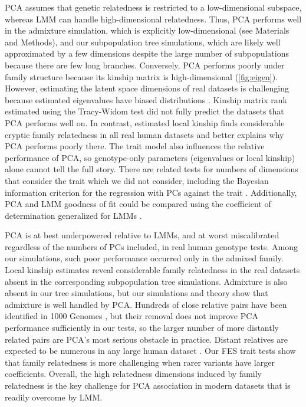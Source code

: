 \documentclass[11pt]{article}
\begin{document}
\begin{linenumbers}
PCA assumes that genetic relatedness is restricted to a low-dimensional subspace, whereas LMM can handle high-dimensional relatedness.
Thus, PCA performs well in the admixture simulation, which is explicitly low-dimensional (see Materials and Methods), and our subpopulation tree simulations, which are likely well approximated by a few dimensions despite the large number of subpopulations because there are few long branches.
Conversely, PCA performs poorly under family structure because its kinship matrix is high-dimensional (\cref{fig:eigen}).
However, estimating the latent space dimensions of real datasets is challenging because estimated eigenvalues have biased distributions \citep{hayashi_bias_2018}.
Kinship matrix rank estimated using the Tracy-Widom test \citep{patterson_population_2006} did not fully predict the datasets that PCA performs well on.
In contrast, estimated local kinship finds considerable cryptic family relatedness in all real human datasets and better explains why PCA performs poorly there.
The trait model also influences the relative performance of PCA, so genotype-only parameters (eigenvalues or local kinship) alone cannot tell the full story.
There are related tests for numbers of dimensions that consider the trait which we did not consider, including the Bayesian information criterion for the regression with PCs against the trait \citep{zhu_nonmetric_2009}.
Additionally, PCA and LMM goodness of fit could be compared using the coefficient of determination generalized for LMMs \citep{sun_variation_2010}.

PCA is at best underpowered relative to LMMs, and at worst miscalibrated regardless of the numbers of PCs included, in real human genotype tests.
Among our simulations, such poor performance occurred only in the admixed family.
Local kinship estimates reveal considerable family relatedness in the real datasets absent in the corresponding subpopulation tree simulations.
Admixture is also absent in our tree simulations, but our simulations and theory show that admixture is well handled by PCA.
Hundreds of close relative pairs have been identified in 1000 Genomes \citep{gazal_high_2015, al-khudhair_inference_2015, fedorova_atlas_2016, schlauch_identification_2017}, but their removal does not improve PCA performance sufficiently in our tests, so the larger number of more distantly related pairs are PCA's most serious obstacle in practice.
Distant relatives are expected to be numerous in any large human dataset \citep{henn_cryptic_2012, shchur_number_2018, loh_mixed-model_2018}.
Our FES trait tests show that family relatedness is more challenging when rarer variants have larger coefficients.
Overall, the high relatedness dimensions induced by family relatedness is the key challenge for PCA association in modern datasets that is readily overcome by LMM.


\end{linenumbers}
\end{document}
